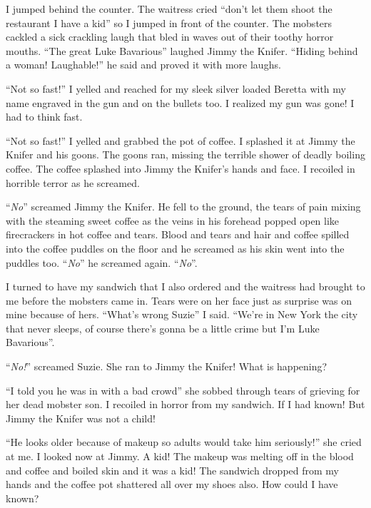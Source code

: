 I jumped behind the counter. The waitress cried ``don't let them
shoot the restaurant I have a kid'' so I jumped in front of the
counter. The mobsters cackled a sick crackling laugh that bled in
waves out of their toothy horror mouths. ``The great Luke Bavarious''
laughed Jimmy the Knifer. ``Hiding behind a woman! Laughable!'' he
said and proved it with more laughs.



``Not so fast!'' I yelled and reached for my sleek silver loaded
Beretta with my name engraved in the gun and on the bullets too. I
realized my gun was gone! I had to think fast.



``Not so fast!'' I yelled and grabbed the pot of coffee. I splashed
it at Jimmy the Knifer and his goons. The goons ran, missing the
terrible shower of deadly boiling coffee. The coffee splashed into
Jimmy the Knifer's hands and face. I recoiled in horrible terror as
he screamed.



``{\em No}'' screamed Jimmy the Knifer. He fell to the ground, the tears of
pain mixing with the steaming sweet coffee as the veins in his
forehead popped open like firecrackers in hot coffee and tears.
Blood and tears and hair and coffee spilled into the coffee puddles
on the floor and he screamed as his skin went into the puddles too.
``{\em No}'' he screamed again. ``{\em No}''.



I turned to have my sandwich that I also ordered and the waitress
had brought to me before the mobsters came in. Tears were on her
face just as surprise was on mine because of hers. ``What's wrong
Suzie'' I said. ``We're in New York the city that never sleeps, of
course there's gonna be a little crime but I'm Luke
Bavarious''.



``{\em No!}'' screamed Suzie. She ran to Jimmy the Knifer! What is
happening?



``I told you he was in with a bad crowd'' she sobbed through tears of
grieving for her dead mobster son. I recoiled in horror from my
sandwich. If I had known! But Jimmy the Knifer was not a
child!



``He looks older because of makeup so adults would take him
seriously!'' she cried at me. I looked now at Jimmy. A kid! The
makeup was melting off in the blood and coffee and boiled skin and
it was a kid! The sandwich dropped from my hands and the coffee pot
shattered all over my shoes also. How could I have known?



